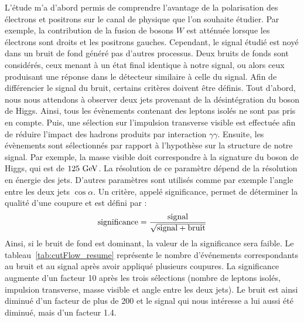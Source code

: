   L'étude m'a d'abord permis de comprendre l'avantage de la polarisation des électrons et positrons sur le canal de physique que l'on souhaite étudier.
  Par exemple, la contribution de la fusion de bosons $W$ est atténuée lorsque les électrons sont droits et les positrons gauches.
  Cependant, le signal étudié est noyé dans un bruit de fond généré pas d'autres processus.
  Deux bruits de fonds sont considérés, ceux menant à un état final identique à notre signal, ou alors ceux produisant une réponse dans le détecteur similaire à celle du signal.
  Afin de différencier le signal du bruit, certains critères doivent être définis.
  Tout d'abord, nous nous attendons à observer deux jets provenant de la désintégration du boson de Higgs. 
  Ainsi, tous les évènements contenant des leptons isolés ne sont pas pris en compte.
  Puis, une sélection sur l'impulsion transverse visible est effectuée afin de réduire l'impact des hadrons produits par interaction $\gamma\gamma$.
  Ensuite, les évènements sont sélectionnés par rapport à l'hypothèse sur la structure de notre signal.
  Par exemple, la masse visible doit correspondre à la signature du boson de Higgs, qui est de $125~\rm{GeV}$.
  La résolution de ce paramètre dépend de la résolution en énergie des jets. 
  D'autres paramètres sont utilisés comme par exemple l'angle entre les deux jets $\cos{\alpha}$.
  Un critère, appelé significance, permet de déterminer la qualité d'une coupure et est défini par :
  \begin{equation}
    \rm{significance} = \frac{\rm{signal}}{\sqrt{\rm{signal} + \rm{bruit}}}
  \end{equation}
  Ainsi, si le bruit de fond est dominant, la valeur de la significance sera faible.
  Le tableau~\ref{tab:cutFlow_resume} représente le nombre d'événements correspondants au bruit et au signal après avoir appliqué plusieurs coupures.
  La significance augmente d'un facteur 10 après les trois sélections (nombre de leptons isolés, impulsion transverse, masse visible et angle entre les deux jets).
  Le bruit est ainsi diminué d'un facteur de plus de 200 et le signal qui nous intéresse a lui aussi été diminué, mais d'un facteur 1.4. 

